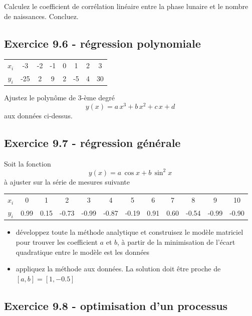 Calculez le coefficient de corrélation linéaire entre la phase lunaire et le nombre de naissances. Concluez.

\subsection*{Exercice 9.6 - régression polynomiale}

\begin{center}
\begin{tabular}{c|ccccccc}
$x_i$ & -3 & -2 & -1 & 0 & 1 & 2 & 3\\
$y_i$ & -25 & 2 & 9 & 2 & -5 & 4 & 30
\end{tabular}
\end{center}
Ajustez le polynôme de 3-ème degré $$y(x)=a\,x^3+b\,x^2+c\,x+d$$ aux données ci-dessus.

\subsection*{Exercice 9.7 - régression générale}

Soit la fonction
$$
y(x)=a\,\cos{x}+b\,\sin^{2}{x}
$$
à ajuster sur la série de mesures suivante
\begin{center}
\begin{tabular}{c|ccccccccccc}
$x_i$ & 0 & 1 & 2 & 3 & 4 & 5 & 6 & 7 & 8 & 9 & 10\\
$y_i$ & 0.99 & 0.15 & -0.73 & -0.99 & -0.87 & -0.19 & 0.91 & 0.60 & -0.54 & -0.99 & -0.90
\end{tabular}
\end{center}
\begin{itemize}
\item développez toute la méthode analytique et construisez le modèle matriciel pour trouver les coefficient $a$ et $b$, à partir de la minimisation de l'écart quadratique entre le modèle est les données
\item appliquez la méthode aux données. La solution doit être proche de $[a,b]=[1,-0.5]$
\end{itemize}

\newpage

\subsection*{Exercice 9.8 - optimisation d'un processus}

